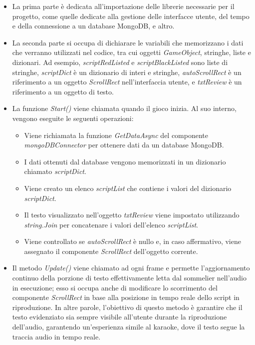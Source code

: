 \begin{itemize}
	\item La prima parte è dedicata all'importazione delle librerie necessarie per il progetto, come quelle dedicate alla gestione delle interfacce utente, del tempo e della connessione a un database MongoDB, e altro.
	\item La seconda parte si occupa di dichiarare le variabili che memorizzano i dati che verranno utilizzati nel codice, tra cui oggetti \textit{GameObject}, stringhe, liste e dizionari. Ad esempio, \textit{scriptRedListed} e \textit{scriptBlackListed} sono liste di stringhe, \textit{scriptDict} è un dizionario di interi e stringhe, \textit{autoScrollRect} è un riferimento a un oggetto \textit{ScrollRect} nell'interfaccia utente, e \textit{txtReview} è un riferimento a un oggetto di testo.
	\item La funzione \textit{Start()} viene chiamata quando il gioco inizia. Al suo interno, vengono eseguite le seguenti operazioni:
	\begin{itemize}
		\item Viene richiamata la funzione \textit{GetDataAsync} del componente \textit{mongoDBConnector} per ottenere dati da un database MongoDB.
		\item I dati ottenuti dal database vengono memorizzati in un dizionario chiamato \textit{scriptDict}.
		\item Viene creato un elenco \textit{scriptList} che contiene i valori del dizionario \textit{scriptDict}.
		\item Il testo visualizzato nell'oggetto \textit{txtReview} viene impostato utilizzando \textit{string.Join} per concatenare i valori dell'elenco \textit{scriptList}.
		\item Viene controllato se \textit{autoScrollRect} è nullo e, in caso affermativo, viene assegnato il componente \textit{ScrollRect} dell'oggetto corrente.
	\end{itemize}

\item Il metodo \textit{Update()} viene chiamato ad ogni frame e permette l'aggiornamento continuo della porzione di testo effettivamente letta dal sommelier nell'audio in esecuzione; esso si occupa anche di modificare lo scorrimento del componente \textit{ScrollRect} in base alla posizione in tempo reale dello script in riproduzione. In altre parole, l'obiettivo di questo metodo è garantire che il testo evidenziato sia sempre visibile all'utente durante la riproduzione dell'audio, garantendo un'esperienza simile al karaoke, dove il testo segue la traccia audio in tempo reale.


\end{itemize}
